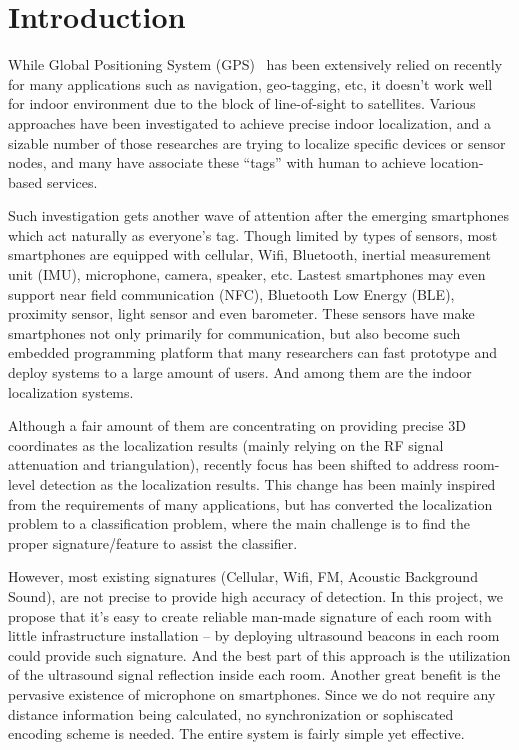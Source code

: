 \section{Introduction}
\label{sec:introduction}

While Global Positioning System (GPS)~\cite{hofmann1993global} has been extensively relied on recently for many applications such as navigation, geo-tagging, etc, it doesn't work well for indoor environment due to the block of line-of-sight to satellites. Various approaches have been investigated to achieve precise indoor localization, and a sizable number of those researches are trying to localize specific devices or sensor nodes, and many have associate these ``tags'' with human to achieve location-based services. 

Such investigation gets another wave of attention after the emerging smartphones which act naturally as everyone's tag. Though limited by types of sensors, most smartphones are equipped with cellular, Wifi, Bluetooth, inertial measurement unit (IMU), microphone, camera, speaker, etc. Lastest smartphones may even support near field communication (NFC), Bluetooth Low Energy (BLE), proximity sensor, light sensor and even barometer. These sensors have make smartphones not only primarily for communication, but also become such embedded programming platform that many researchers can fast prototype and deploy systems to a large amount of users. And among them are the indoor localization systems.

Although a fair amount of them are concentrating on providing precise 3D coordinates as the localization results (mainly relying on the RF signal attenuation and triangulation), recently focus has been shifted to address room-level detection as the localization results. This change has been mainly inspired from the requirements of many applications, but has converted the localization problem to a classification problem, where the main challenge is to find the proper signature/feature to assist the classifier.

However, most existing signatures (Cellular, Wifi, FM, Acoustic Background Sound), are not precise to provide high accuracy of detection. In this project, we propose that it's easy to create reliable man-made signature of each room with little infrastructure installation -- by deploying ultrasound beacons in each room could provide such signature. And the best part of this approach is the utilization of the ultrasound signal reflection inside each room. Another great benefit is the pervasive existence of microphone on smartphones. Since we do not require any distance information being calculated, no synchronization or sophiscated encoding scheme is needed. The entire system is fairly simple yet effective.

